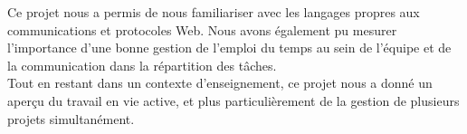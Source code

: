 \documentclass[12pt,a4paper]{report}
\begin{document}
Ce projet nous a permis de nous familiariser avec les langages propres aux communications et protocoles Web. Nous avons également pu mesurer l'importance d'une bonne gestion de l'emploi du temps au sein de l'équipe et de la communication dans la répartition des tâches. \\

Tout en restant dans un contexte d'enseignement, ce projet nous a donné un aperçu du travail en vie active, et plus particulièrement de la gestion de plusieurs projets simultanément.






\end{document}
